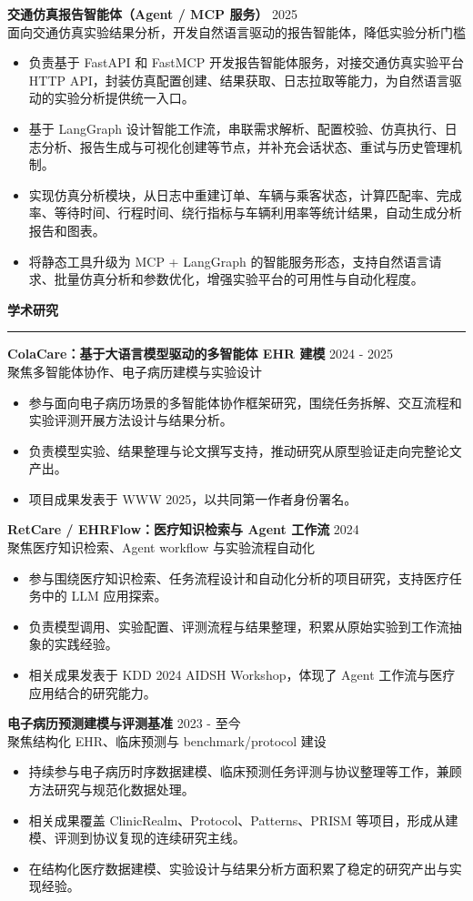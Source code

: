 \documentclass[10pt,a4paper]{ctexart}
\newcommand{\sectiontitle}[1]{
    \vspace{4mm}
    {\large\textbf{#1}}
    \vspace{1mm}
    \hrule
    \vspace{3mm}
}
\newcommand{\projectentry}[4]{
    \noindent
    \textbf{#1} \hfill #2 \\
    {\small #3} \\
    #4
    \vspace{2mm}
}
\begin{document}
\projectentry
{交通仿真报告智能体（Agent / MCP 服务）}
{2025}
{面向交通仿真实验结果分析，开发自然语言驱动的报告智能体，降低实验分析门槛}
{
\begin{itemize}
    \item 负责基于 FastAPI 和 FastMCP 开发报告智能体服务，对接交通仿真实验平台 HTTP API，封装仿真配置创建、结果获取、日志拉取等能力，为自然语言驱动的实验分析提供统一入口。
    \item 基于 LangGraph 设计智能工作流，串联需求解析、配置校验、仿真执行、日志分析、报告生成与可视化创建等节点，并补充会话状态、重试与历史管理机制。
    \item 实现仿真分析模块，从日志中重建订单、车辆与乘客状态，计算匹配率、完成率、等待时间、行程时间、绕行指标与车辆利用率等统计结果，自动生成分析报告和图表。
    \item 将静态工具升级为 MCP + LangGraph 的智能服务形态，支持自然语言请求、批量仿真分析和参数优化，增强实验平台的可用性与自动化程度。
\end{itemize}
}

\sectiontitle{学术研究}

\projectentry
{ColaCare：基于大语言模型驱动的多智能体 EHR 建模}
{2024 - 2025}
{聚焦多智能体协作、电子病历建模与实验设计}
{
\begin{itemize}
    \item 参与面向电子病历场景的多智能体协作框架研究，围绕任务拆解、交互流程和实验评测开展方法设计与结果分析。
    \item 负责模型实验、结果整理与论文撰写支持，推动研究从原型验证走向完整论文产出。
    \item 项目成果发表于 WWW 2025，以共同第一作者身份署名。
\end{itemize}
}

\projectentry
{RetCare / EHRFlow：医疗知识检索与 Agent 工作流}
{2024}
{聚焦医疗知识检索、Agent workflow 与实验流程自动化}
{
\begin{itemize}
    \item 参与围绕医疗知识检索、任务流程设计和自动化分析的项目研究，支持医疗任务中的 LLM 应用探索。
    \item 负责模型调用、实验配置、评测流程与结果整理，积累从原始实验到工作流抽象的实践经验。
    \item 相关成果发表于 KDD 2024 AIDSH Workshop，体现了 Agent 工作流与医疗应用结合的研究能力。
\end{itemize}
}

\projectentry
{电子病历预测建模与评测基准}
{2023 - 至今}
{聚焦结构化 EHR、临床预测与 benchmark/protocol 建设}
{
\begin{itemize}
    \item 持续参与电子病历时序数据建模、临床预测任务评测与协议整理等工作，兼顾方法研究与规范化数据处理。
    \item 相关成果覆盖 ClinicRealm、Protocol、Patterns、PRISM 等项目，形成从建模、评测到协议复现的连续研究主线。
    \item 在结构化医疗数据建模、实验设计与结果分析方面积累了稳定的研究产出与实现经验。
\end{itemize}
}
\end{document}
